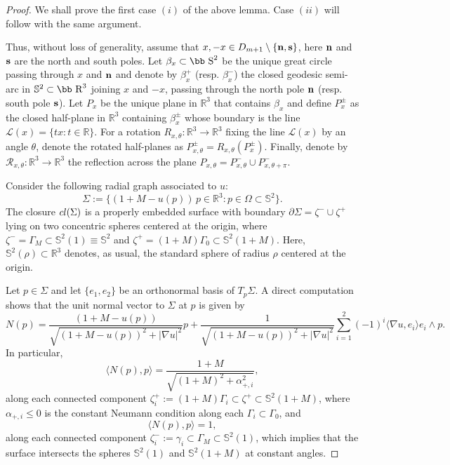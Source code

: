 \documentclass[11pt]{article}
\def\r{\hbox{\bb R}}
\def\s{\hbox{\bb S}}
\numberwithin{equation} {section}
\begin{document}
\begin{proof}
	We shall prove the first case $(i)$ of the above lemma. Case $(ii)$ will follow with the same argument.
	
	Thus, without loss of generality, assume that $x,-x\in D_{m+1}\setminus \{{\bf n},{\bf s}\}$, here ${\bf n}$ and ${\bf s}$ are the north and south poles. Let $\beta _x \subset \s^2$ be the unique great circle passing through $x$ and ${\bf n}$ and denote by $\beta_x^+$ (resp. $\beta_x^-$) the closed geodesic semi-arc in $\mathbb{S}^2 \subset \r ^3$ joining $x$ and $-x$, passing through the north pole ${\bf n}$ (resp. south pole ${\bf s}$). Let $P_x$ be the unique plane in $\mathbb{R}^3$ that contains $\beta _x$ and define $P_x^\pm$ as the closed half-plane in $\mathbb{R}^3$ containing $\beta_x^\pm$ whose boundary is the line $\mathcal{L}(x) = \{ t x : t \in \mathbb{R} \}$. For a rotation $R_{x,\theta}: \mathbb{R}^3 \to \mathbb{R}^3$ fixing the line $\mathcal{L}(x)$ by an angle $\theta$, denote the rotated half-planes as $P^\pm_{x,\theta} = R_{x,\theta}(P^\pm_x)$. Finally, denote by $\mathcal{R}_{x,\theta}: \mathbb{R}^3 \to \mathbb{R}^3$ the reflection across the plane $P_{x,\theta} = P^-_{x,\theta} \cup P^-_{x,\theta + \pi}$. 

	Consider the following radial graph associated to $u$:
\[
\Sigma:=\{(1+M-u(p))\,p\in\mathbb{R}^3 : p\in\Omega \subset \mathbb{S}^2\}.
\]
	The closure $\textup{cl} (\Sigma)$ is a properly embedded surface with boundary
$\partial\Sigma=\zeta^-\cup\zeta^+$ lying on two concentric spheres centered at the origin, where $\zeta^-=\Gamma_M\subset\mathbb{S}^2(1) \equiv \mathbb{S}^2$ and $\zeta^+=(1+M)\Gamma_0\subset\mathbb{S}^2(1+M)$. Here, $\mathbb{S}^2 (\rho ) \subset \mathbb{R}^3$ denotes, as usual, the standard sphere of radius $\rho $ centered at the origin. 

Let $p \in \Sigma $ and let $\{e_1,e_2\}$ be an orthonormal basis of $T_p \Sigma $. A direct computation shows that the unit normal vector to $\Sigma$ at $p$ is given by
$$ N(p) = \frac{(1+M - u(p))}{\sqrt{(1+M - u(p))^2 + |\nabla u|^2}} p + \frac{1}{\sqrt{(1+M - u(p))^2 + |\nabla u|^2}} \sum_{i=1}^2 (-1)^i \langle \nabla u, e_i \rangle e_i \wedge p.$$
In particular, 
$$\langle N(p), p \rangle = \frac{1 + M}{\sqrt{(1 + M)^2 + \alpha_{+,i}^2}} ,$$along each connected component $\zeta^+_i := (1+M) \Gamma_i \subset \zeta ^+ \subset \mathbb{S}^2(1+M)$, where $\alpha _{+,i} \leq 0$ is the constant Neumann condition along each $\Gamma _i  \subset \Gamma  _0$, and 
$$\langle N(p), p \rangle = 1,$$along each connected component $\zeta ^- _i := \gamma_i \subset \Gamma _M \subset \mathbb{S}^2(1)$, which implies that  the surface intersects the spheres $\mathbb{S}^2(1)$ and $ \mathbb{S}^2(1+M)$ at constant angles.


\end{proof}
\end{document}
